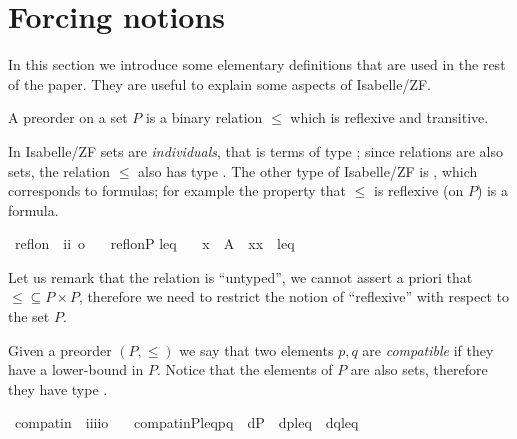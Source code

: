 \section{Forcing notions}\label{sec:forcing-posets}

In this section we introduce some elementary definitions that are used
in the rest of the paper. They are useful to explain some aspects of
Isabelle/ZF.

\begin{definition}
  A preorder on a set $P$ is a binary relation ${\leqslant}$ which is
  reflexive and transitive.
\end{definition}

In Isabelle/ZF sets are \emph{individuals}, that is terms of type
; since relations are also sets, the relation ${\leqslant}$
also has type . The other type of Isabelle/ZF is ,
which corresponds to formulas; for example the property that
${\leqslant}$ is reflexive (on $P$) is a formula.
\begin{isabellebody}
\isanewline
{}\isamarkupfalse%
\ refl{\isacharunderscore}on\ {\isacharcolon}{\isacharcolon}\ {\isachardoublequoteopen}{\isacharbrackleft}i{\isacharcomma}i{\isacharbrackright}\ {\isasymRightarrow}o{\isachardoublequoteclose}\ \isanewline
\ \ {\isachardoublequoteopen}refl{\isacharunderscore}on{\isacharparenleft}P{\isacharcomma} leq {\isacharparenright}\ {\isacharequal}{\isacharequal}\ {\isasymforall}\ x\ {\isasymin}\ A\ {\isachardot}\ {\isacharless}x{\isacharcomma}x{\isachargreater}\ {\isasymin}\ leq{\isachardoublequoteclose}\isanewline
\end{isabellebody}

Let us remark that the relation is ``untyped'', we cannot assert a
priori that ${\leqslant} \subseteq P \times P$, therefore we need to
restrict the notion of ``reflexive'' with respect to the set $P$.
\begin{definition}
  Given a preorder $(P,\leqslant)$ we say that two elements $p,q$ are
  \emph{compatible} if they have a lower-bound in $P$. Notice that
  the elements of $P$ are also sets, therefore they have type
  .
  \begin{isabellebody}%
    \isanewline
  \isamarkupfalse%
\ compat{\isacharunderscore}in\ {\isacharcolon}{\isacharcolon}\ {\isachardoublequoteopen}i{\isasymRightarrow}i{\isasymRightarrow}i{\isasymRightarrow}i{\isasymRightarrow}o{\isachardoublequoteclose}\ \isanewline
\ \ {\isachardoublequoteopen}compat{\isacharunderscore}in{\isacharparenleft}P{\isacharcomma}leq{\isacharcomma}p{\isacharcomma}q{\isacharparenright}\ {\isacharequal}{\isacharequal}\ {\isasymexists}d{\isasymin}P\ {\isachardot}\ {\isasymlangle}d{\isacharcomma}p{\isasymrangle}{\isasymin}leq\ {\isasymand}\ {\isasymlangle}d{\isacharcomma}q{\isasymrangle}{\isasymin}leq{\isachardoublequoteclose}\isanewline
\end{isabellebody}
\end{definition}

